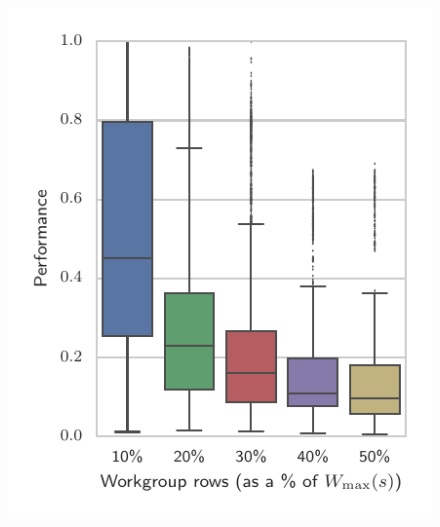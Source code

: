 ~%
\begin{subfigure}[h]{.48\textwidth}
\centering
\includegraphics{img/performance_max_r}
\vspace{-1.5em} %
\caption{}
\label{fig:performance-wg-r}
\end{subfigure}
